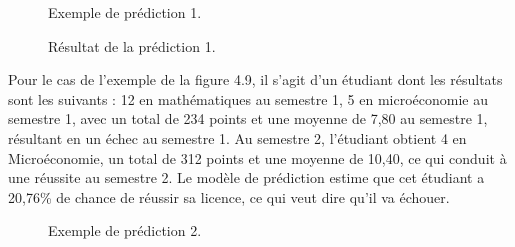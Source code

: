 \begin{figure}[H]%
    \center%
    \setlength{\fboxsep}{5pt}%
    \setlength{\fboxrule}{0.5pt}%
    \caption{Exemple de prédiction 1.}%
\end{figure}

\begin{figure}[H]%
    \center%
    \setlength{\fboxsep}{5pt}%
    \setlength{\fboxrule}{0.5pt}%
    \caption{Résultat de la prédiction 1.}%
\end{figure}

Pour le cas de l'exemple de la figure 4.9, il s'agit d'un étudiant dont les résultats sont les suivants : 12 en mathématiques au semestre 1, 5 en microéconomie au semestre 1, avec un total de 234 points et une moyenne de 7,80 au semestre 1, résultant en un échec au semestre 1. Au semestre 2, l'étudiant obtient 4 en Microéconomie, un total de 312 points et une moyenne de 10,40, ce qui conduit à une réussite au semestre 2. Le modèle de prédiction estime que cet étudiant a 20,76\% de chance de réussir sa licence, ce qui veut dire qu'il va échouer.
\begin{figure}[H]%
    \center%
    \setlength{\fboxsep}{5pt}%
    \setlength{\fboxrule}{0.5pt}%
    \caption{Exemple de prédiction 2.}%
\end{figure}

